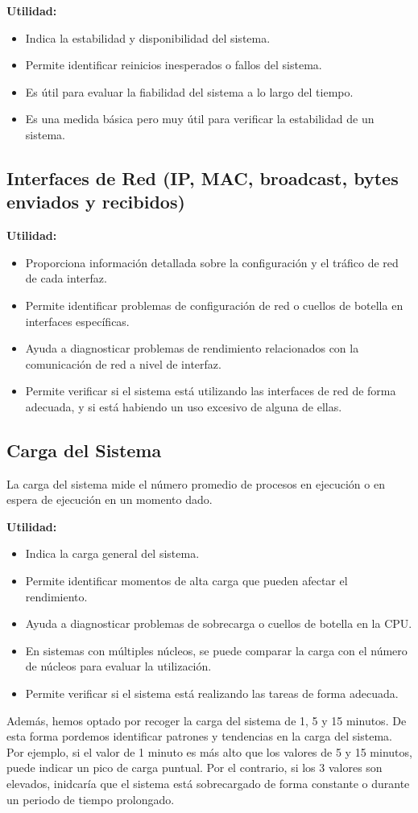 \documentclass{article}
\begin{document}
\textbf{Utilidad:}
\begin{itemize}
    \item Indica la estabilidad y disponibilidad del sistema.
    \item Permite identificar reinicios inesperados o fallos del sistema.
    \item Es útil para evaluar la fiabilidad del sistema a lo largo del tiempo.
    \item Es una medida básica pero muy útil para verificar la estabilidad de un sistema.
\end{itemize}

\subsection{Interfaces de Red (IP, MAC, broadcast, bytes enviados y recibidos)}

\textbf{Utilidad:}
\begin{itemize}
    \item Proporciona información detallada sobre la configuración y el tráfico de red de cada interfaz.
    \item Permite identificar problemas de configuración de red o cuellos de botella en interfaces específicas.
    \item Ayuda a diagnosticar problemas de rendimiento relacionados con la comunicación de red a nivel de interfaz.
    \item Permite verificar si el sistema está utilizando las interfaces de red de forma adecuada, y si está habiendo un uso excesivo de alguna de ellas.
\end{itemize}
\subsection{Carga del Sistema}


La carga del sistema mide el número promedio de procesos en ejecución o en espera de ejecución en un momento dado.

\textbf{Utilidad:}
\begin{itemize}
    \item Indica la carga general del sistema.
    \item Permite identificar momentos de alta carga que pueden afectar el rendimiento.
    \item Ayuda a diagnosticar problemas de sobrecarga o cuellos de botella en la CPU.
    \item En sistemas con múltiples núcleos, se puede comparar la carga con el número de núcleos para evaluar la utilización.
    \item Permite verificar si el sistema está realizando las tareas de forma adecuada.
\end{itemize}
Además, hemos optado por recoger la carga del sistema de 1, 5 y 15 minutos. De esta forma pordemos identificar patrones y tendencias en la carga del sistema.
Por ejemplo, si el valor de 1 minuto es más alto que los valores de 5 y 15 minutos, puede indicar un pico de carga puntual.
Por el contrario, si los 3 valores son elevados, inidcaría que el sistema está sobrecargado de forma constante o durante un periodo de tiempo prolongado.
\end{document}
